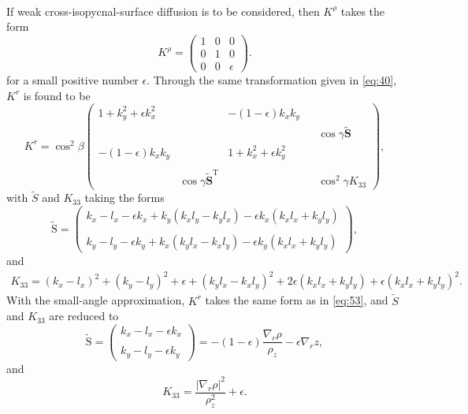 \documentclass[12pt]{report}
\def\tilde{\widetilde}
\def\bs{\boldsymbol}
\def\Sb{\bs{\mathrm{S}}}
\begin{document}
\\
If weak cross-isopycnal-surface diffusion is to be considered, then
$K^\rho$ takes the form
\begin{equation}
\label{eq:48}
  K^\rho = \left(
    \begin{matrix}
      1 & 0 & 0\\
      0 & 1 & 0\\
      0 & 0 & \epsilon
    \end{matrix}\right).
\end{equation}
for a small positive number $\epsilon$. Through the same transformation
given in \eqref{eq:40}, $K^r$ is found to be
\begin{equation}
\label{eq:50}
  K^r = \cos^2\beta\left(
    \begin{matrix}
      1 + k_y^2 + \epsilon k_x^2& { }  &  -(1-\epsilon)k_xk_y & { } & { }\\
          { }   &     { }   & { } & { } & \cos\gamma{\tilde{\mathbf{S}}}\\
      -(1-\epsilon)k_xk_y & { } & 1 + k_x^2+\epsilon k_y^2 & { } & { }\\
         { } & { } & { } & { } & { } \\
         { } & \cos\gamma\tilde{\mathbf{S}}^\textrm{T} & { } & { } &
         \cos^2\gamma K_{33}
    \end{matrix}\right),
\end{equation}
with $\tilde S$ and $K_{33}$ taking the forms
\begin{equation*}
 \tilde{\Sb} = \left(\begin{matrix}k_x- l_x -\epsilon k_x + k_y(k_xl_y - k_yl_x) -
  \epsilon k_x(k_xl_x+k_yl_y) \\
 \\ 
  k_y-l_y - \epsilon k_y
    + k_x(k_yl_x - k_xl_y) - \epsilon
    k_y(k_xl_x+k_yl_y)\end{matrix}\right),
\end{equation*}
and 
\begin{multline*}
K_{33} = (k_x - l_x)^2 + (k_y - l_y)^2 +\epsilon +  (k_yl_x - k_xl_y)^2 + 
2\epsilon(k_xl_x+k_yl_y) + \epsilon(k_xl_x+k_yl_y)^2.
\end{multline*}
With the small-angle  approximation, $K^r$ takes the same form as in
\eqref{eq:53}, and $\tilde{S}$ and $K_{33}$ are reduced to 
\begin{equation}
\label{eq:56}
 \tilde{\Sb} = \left(\begin{matrix}k_x- l_x - \epsilon k_x \\
 \\ 
  k_y-l_y - \epsilon k_y
  \end{matrix}\right) =  -(1-\epsilon)\dfrac{\nabla_r\rho}{\rho_z} - 
  \epsilon\nabla_r z,
\end{equation}
and 
\begin{equation}
\label{eq:57}
K_{33} = \dfrac{|\nabla_r\rho|^2}{\rho_z^2}+\epsilon.
\end{equation}
\end{document}
